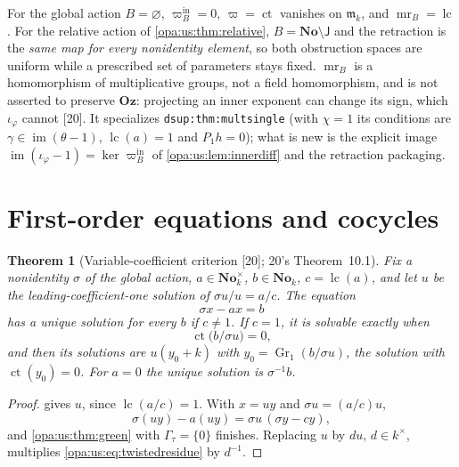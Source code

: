 \documentclass[11pt,oneside]{article}
\numberwithin{equation}{section}
\newtheorem{theorem}{Theorem}[section]
\theoremstyle{definition}
\theoremstyle{remark}
\newcommand{\No}{\mathbf{No}}
\newcommand{\Oz}{\mathbf{Oz}}
\newcommand{\mm}{\mathfrak m}
\newcommand{\lc}{\operatorname{lc}}
\newcommand{\ct}{\operatorname{ct}}
\newcommand{\src}[1]{\textup{\textsf{\small[#1]}}}
\newcommand{\lbl}[1]{\nolinkurl{#1}}
\begin{document}
For the global action $B=\varnothing$, $\varpi^{\mathrm{in}}_B=0$, $\varpi=\ct$ vanishes on $\mm_k$, and $\operatorname{mr}_B=\lc$. For the relative action of
\cref{opa:us:thm:relative}, $B=\No\setminus\mathsf J$ and the retraction is the \emph{same map for every nonidentity element}, so both obstruction spaces
are uniform while a prescribed set of parameters stays fixed. $\operatorname{mr}_B$ is a homomorphism of multiplicative groups, not a field
homomorphism, and is not asserted to preserve $\Oz$: projecting an inner exponent can change its sign, which $\iota_\varphi$ cannot \src{20}. It
specializes \lbl{dsup:thm:multsingle} (with $\chi=1$ its conditions are $\gamma\in\operatorname{im}(\theta-1)$, $\lc(a)=1$ and $P_1h=0$); what is new is the explicit
image $\operatorname{im}(\iota_\varphi-1)=\ker\varpi^{\mathrm{in}}_B$ of \cref{opa:us:lem:innerdiff} and the retraction packaging.

\section{First-order equations and cocycles}\label{opa:us:sec:cocycles}

\begin{theorem}[Variable-coefficient criterion \src{20}; 20's Theorem~10.1]\label{opa:us:thm:firstorder}
Fix a nonidentity $\sigma$ of the global action, $a\in\No_k^\times$, $b\in\No_k$, $c=\lc(a)$, and let $u$ be the leading-coefficient-one solution of
$\sigma u/u=a/c$. The equation
\begin{equation}\label{opa:us:eq:firstorder}
 \sigma x-ax=b
\end{equation}
has a unique solution for every $b$ if $c\ne1$. If $c=1$, it is solvable exactly when
\begin{equation}\label{opa:us:eq:twistedresidue}
 \ct\bigl(b/\sigma u\bigr)=0,
\end{equation}
and then its solutions are $u(y_0+k)$ with $y_0=\operatorname{Gr}_1(b/\sigma u)$, the solution with $\ct(y_0)=0$. For $a=0$ the unique solution is
$\sigma^{-1}b$.
\end{theorem}
\begin{proof}
 gives $u$, since $\lc(a/c)=1$. With $x=uy$ and $\sigma u=(a/c)u$,
\begin{equation}\label{opa:us:eq:gauge}
 \sigma(uy)-a(uy)=\sigma u\,(\sigma y-cy),
\end{equation}
and \cref{opa:us:thm:green} with $\Gamma_\tau=\{0\}$ finishes. Replacing $u$ by $du$, $d\in k^\times$, multiplies \eqref{opa:us:eq:twistedresidue} by $d^{-1}$.
\end{proof}
\end{document}
